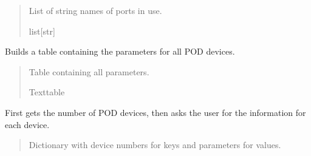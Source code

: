 \documentclass[letterpaper,10pt,english]{sphinxmanual}
\begin{document}
\begin{fulllineitems}
\begin{fulllineitems}
\begin{quote}
\begin{description}
\sphinxAtStartPar
List of string names of ports in use.

\sphinxAtStartPar
list{[}str{]}

\end{description}\end{quote}

\end{fulllineitems}


\begin{fulllineitems}
\label{\detokenize{Setup_PodInterface:Setup_PodInterface.Setup_Interface._GetPODdeviceParameterTable}}
\pysigstartsignatures
{}
\pysigstopsignatures
\sphinxAtStartPar
Builds a table containing the parameters for all POD devices.
\begin{quote}\begin{description}
\sphinxAtStartPar
Table containing all parameters.

\sphinxAtStartPar
Texttable

\end{description}\end{quote}

\end{fulllineitems}


\begin{fulllineitems}
\label{\detokenize{Setup_PodInterface:Setup_PodInterface.Setup_Interface._GetParam_allPODdevices}}
\pysigstartsignatures
{}
\pysigstopsignatures
\sphinxAtStartPar
First gets the number of POD devices, then asks the user for the information         for each device.
\begin{quote}\begin{description}
\sphinxAtStartPar
Dictionary with device numbers for keys and parameters for values.


\end{description}
\end{quote}
\end{fulllineitems}
\end{fulllineitems}
\end{document}
